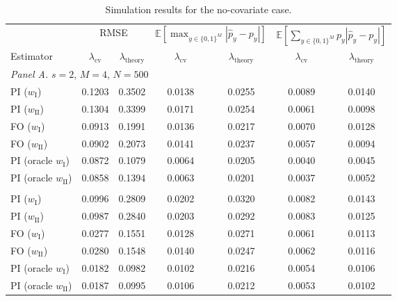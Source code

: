 \documentclass[11pt]{article}
\begin{document}
\begin{table}[htp!]
\centering
\begin{threeparttable}
\caption{Simulation results for the no-covariate case.}
\label{tab:unconditional}
\begin{tabular}{lcccccc}
\toprule
& \multicolumn{2}{c}{RMSE}
& \multicolumn{2}{c}{$\mathbb{E}\!\left[\max_{y\in\{0,1\}^M}\left|\hat{p}_y-p_y\right|\right]$}
& \multicolumn{2}{c}{$\mathbb{E}\!\left[\sum_{y\in\{0,1\}^M} p_y\left|\hat{p}_y-p_y\right|\right]$} \\
\cmidrule(lr){2-3}\cmidrule(lr){4-5}\cmidrule(lr){6-7}
Estimator & $\lambda_{\mathrm{cv}}$ & $\lambda_{\mathrm{theory}}$
& $\lambda_{\mathrm{cv}}$ & $\lambda_{\mathrm{theory}}$
& $\lambda_{\mathrm{cv}}$ & $\lambda_{\mathrm{theory}}$ \\
\midrule
\multicolumn{7}{l}{\textit{Panel A.} $s=2$, $M=4$, $N=500$} \\
PI ($w_{\mathrm{I}}$)              & 0.1203 & 0.3502 & 0.0138 & 0.0255 & 0.0089 & 0.0140 \\
PI ($w_{\mathrm{II}}$)             & 0.1304 & 0.3399 & 0.0171 & 0.0254 & 0.0061 & 0.0098 \\
FO ($w_{\mathrm{I}}$)              & 0.0913 & 0.1991 & 0.0136 & 0.0217 & 0.0070 & 0.0128 \\
FO ($w_{\mathrm{II}}$)             & 0.0902 & 0.2073 & 0.0141 & 0.0237 & 0.0057 & 0.0094 \\
PI (oracle $w_{\mathrm{I}}$)       & 0.0872 & 0.1079 & 0.0064 & 0.0205 & 0.0040 & 0.0045 \\
PI (oracle $w_{\mathrm{II}}$)      & 0.0858 & 0.1394 & 0.0063 & 0.0201 & 0.0037 & 0.0052 \\
\addlinespace
\multicolumn{7}{l}{\textit{Panel B.} $s=5$, $M=4$, $N=500$} \\
PI ($w_{\mathrm{I}}$)              & 0.0996 & 0.2809 & 0.0202 & 0.0320 & 0.0082 & 0.0143 \\
PI ($w_{\mathrm{II}}$)             & 0.0987 & 0.2840 & 0.0203 & 0.0292 & 0.0083 & 0.0125 \\
FO ($w_{\mathrm{I}}$)              & 0.0277 & 0.1551 & 0.0128 & 0.0271 & 0.0061 & 0.0113 \\
FO ($w_{\mathrm{II}}$)             & 0.0280 & 0.1548 & 0.0140 & 0.0247 & 0.0062 & 0.0116 \\
PI (oracle $w_{\mathrm{I}}$)       & 0.0182 & 0.0982 & 0.0102 & 0.0216 & 0.0054 & 0.0106 \\
PI (oracle $w_{\mathrm{II}}$)      & 0.0187 & 0.0995 & 0.0106 & 0.0212 & 0.0053 & 0.0102 \\

\end{tabular}
\end{threeparttable}
\end{table}
\end{document}
